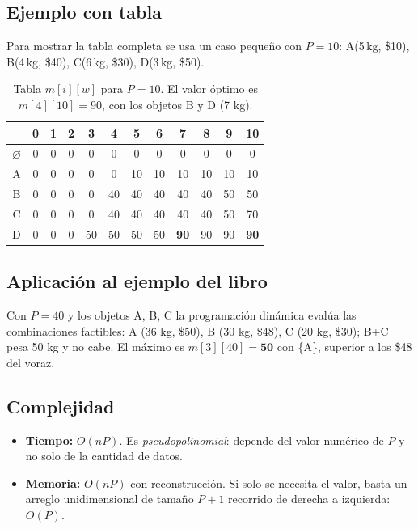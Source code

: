 \documentclass[12pt,a4paper]{article}
\begin{document}
\subsection{Ejemplo con tabla}
Para mostrar la tabla completa se usa un caso pequeño con $P=10$: A(5\,kg, \$10), B(4\,kg, \$40), C(6\,kg, \$30), D(3\,kg, \$50).
\begin{table}[H]
\centering
\small
\setlength{\tabcolsep}{4pt}
\begin{tabular}{c|ccccccccccc}
 & 0 & 1 & 2 & 3 & 4 & 5 & 6 & 7 & 8 & 9 & 10 \\
\hline
$\varnothing$ & 0 & 0 & 0 & 0 & 0 & 0 & 0 & 0 & 0 & 0 & 0 \\
A & 0 & 0 & 0 & 0 & 0 & 10 & 10 & 10 & 10 & 10 & 10 \\
B & 0 & 0 & 0 & 0 & 40 & 40 & 40 & 40 & 40 & 50 & 50 \\
C & 0 & 0 & 0 & 0 & 40 & 40 & 40 & 40 & 40 & 50 & 70 \\
D & 0 & 0 & 0 & 50 & 50 & 50 & 50 & \textbf{90} & 90 & 90 & \textbf{90} \\
\end{tabular}
\caption{Tabla $m[i][w]$ para $P=10$. El valor óptimo es $m[4][10]=90$, con los objetos B y D (7 kg).}
\end{table}

\subsection{Aplicación al ejemplo del libro}
Con $P=40$ y los objetos A, B, C la programación dinámica evalúa las combinaciones factibles: A (36 kg, \$50), B (30 kg, \$48), C (20 kg, \$30); B+C pesa 50 kg y no cabe. El máximo es $m[3][40]=\mathbf{50}$ con \{A\}, superior a los \$48 del voraz.

\subsection{Complejidad}
\begin{itemize}[nosep]
  \item \textbf{Tiempo:} $O(nP)$. Es \emph{pseudopolinomial}: depende del valor numérico de $P$ y no solo de la cantidad de datos.
  \item \textbf{Memoria:} $O(nP)$ con reconstrucción. Si solo se necesita el valor, basta un arreglo unidimensional de tamaño $P+1$ recorrido de derecha a izquierda: $O(P)$.
\end{itemize}

\end{document}
